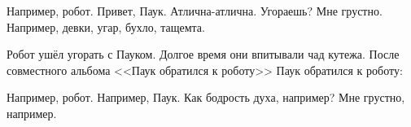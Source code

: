 \begin{dialog}
\X Например, робот.
\R Привет, Паук.
\X Атлична-атлична. Угораешь?
\R Мне грустно.
\X Например, девки, угар, бухло, тащемта.
\end{dialog}

\begin{monolog}
Робот ушёл угорать с Пауком. Долгое время они впитывали чад кутежа. После совместного альбома <<Паук обратился к роботу>> Паук обратился к роботу:
\end{monolog}

\begin{dialog}
\X Например, робот.
\R Например, Паук.
\X Как бодрость духа, например?
\R Мне грустно, например.
\end{dialog}